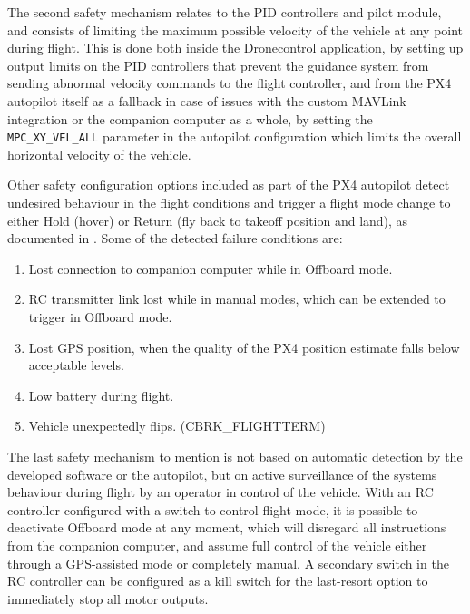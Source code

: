 The second safety mechanism relates to the PID controllers and pilot module, and consists of limiting the maximum possible velocity of the vehicle at any point during flight.
This is done both inside the Dronecontrol application, by setting up output limits on the PID controllers that prevent the guidance system from sending abnormal velocity commands to the flight controller, and from the PX4 autopilot itself as a fallback in case of issues with the custom MAVLink integration or the companion computer as a whole, by setting the \texttt{MPC\_XY\_VEL\_ALL} parameter in the autopilot configuration which limits the overall horizontal velocity of the vehicle.

Other safety configuration options included as part of the PX4 autopilot detect undesired behaviour in the flight conditions and trigger a flight mode change to either Hold (hover) or Return (fly back to takeoff position and land), as documented in  \cite{px4-docs-safety}.
Some of the detected failure conditions are:
\begin{enumerate}
    \item Lost connection to companion computer while in Offboard mode.
    \item RC transmitter link lost while in manual modes, which can be extended to trigger in Offboard mode.
    \item Lost GPS position, when the quality of the PX4 position estimate falls below acceptable levels.
    \item Low battery during flight.
    \item Vehicle unexpectedly flips.  (CBRK\_FLIGHTTERM)
\end{enumerate}

The last safety mechanism to mention is not based on automatic detection by the developed software or the autopilot, but on active surveillance of the systems behaviour during flight by an operator in control of the vehicle.
With an RC controller configured with a switch to control flight mode, it is possible to deactivate Offboard mode at any moment, which will disregard all instructions from the companion computer, and assume full control of the vehicle either through a GPS-assisted mode or completely manual.
A secondary switch in the RC controller can be configured as a kill switch for the last-resort option to immediately stop all motor outputs.
